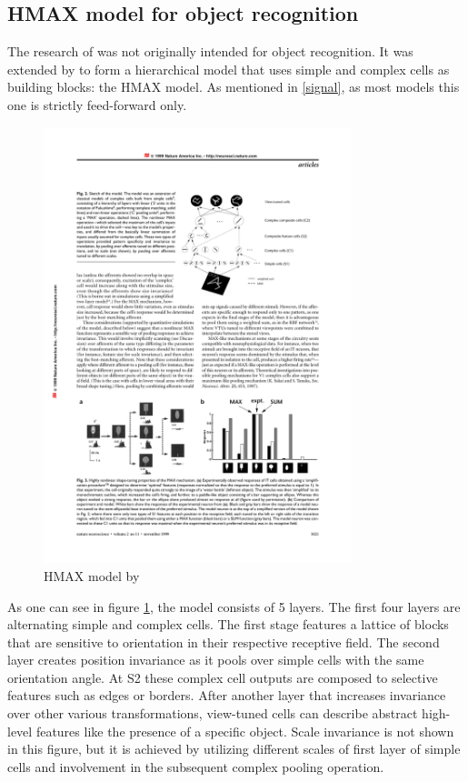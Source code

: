 		\subsection{HMAX model for object recognition}\label{hmax}
		
			The research of \citeauthor{hubel1962receptive} was not originally intended for object recognition. It was extended by \citeauthor{riesenhuber1999hierarchical} to form a hierarchical model that uses simple and complex cells as building blocks: the HMAX model. As mentioned in \ref{signal}, as most models this one is strictly feed-forward only. 
		
			\begin{figure}[H]
				\centering
				\includegraphics[width=0.8\textwidth, trim= 9cm 18cm 2.5cm 4cm, clip]{images/riesenhuber-poggio-1999-models-p3.pdf}
				\caption{HMAX model by \citep{riesenhuber1999hierarchical}}
				\label{hmax-model}
			\end{figure}
			
			As one can see in figure \ref{hmax-model}, the model consists of 5 layers. The first four layers are alternating simple and complex cells. The first stage features a lattice of blocks that are sensitive to orientation in their respective receptive field. The second layer creates position invariance as it pools over simple cells with the same orientation angle. At S2 these complex cell outputs are composed to selective features such as edges or borders. After another layer that increases invariance over other various transformations, view-tuned cells can describe abstract high-level features like the presence of a specific object. Scale invariance is not shown in this figure, but it is achieved by utilizing different scales of first layer of simple cells and involvement in the subsequent complex pooling operation.
			
